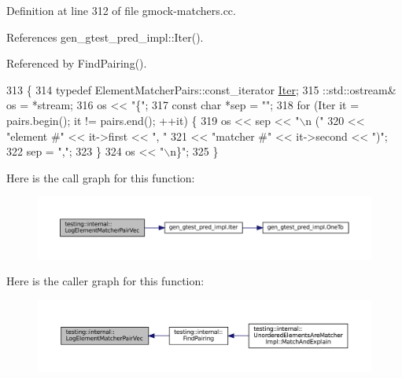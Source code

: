 Definition at line 312 of file gmock-\/matchers.\+cc.



References gen\+\_\+gtest\+\_\+pred\+\_\+impl\+::\+Iter().



Referenced by Find\+Pairing().


\begin{DoxyCode}
313                                                          \{
314   \textcolor{keyword}{typedef} ElementMatcherPairs::const\_iterator \hyperlink{namespacegen__gtest__pred__impl_ac016218b7c9437d1d5ac85c574c83069}{Iter};
315   ::std::ostream& os = *stream;
316   os << \textcolor{stringliteral}{"\{"};
317   \textcolor{keyword}{const} \textcolor{keywordtype}{char} *sep = \textcolor{stringliteral}{""};
318   \textcolor{keywordflow}{for} (Iter it = pairs.begin(); it != pairs.end(); ++it) \{
319     os << sep << \textcolor{stringliteral}{"\(\backslash\)n  ("}
320        << \textcolor{stringliteral}{"element #"} << it->first << \textcolor{stringliteral}{", "}
321        << \textcolor{stringliteral}{"matcher #"} << it->second << \textcolor{stringliteral}{")"};
322     sep = \textcolor{stringliteral}{","};
323   \}
324   os << \textcolor{stringliteral}{"\(\backslash\)n\}"};
325 \}
\end{DoxyCode}
Here is the call graph for this function\+:
\nopagebreak
\begin{figure}[H]
\begin{center}
\leavevmode
\includegraphics[width=350pt]{namespacetesting_1_1internal_a7e3ffe5f66db16c3ab89de55eac65bfa_cgraph}
\end{center}
\end{figure}
Here is the caller graph for this function\+:
\nopagebreak
\begin{figure}[H]
\begin{center}
\leavevmode
\includegraphics[width=350pt]{namespacetesting_1_1internal_a7e3ffe5f66db16c3ab89de55eac65bfa_icgraph}
\end{center}
\end{figure}
\mbox{\label{namespacetesting_1_1internal_a69ffdba5ee36743e88d8f89b79e566ff}} 
